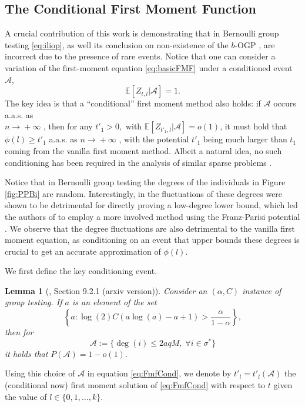 \documentclass[12pt,reqno]{amsart}
\numberwithin{equation}{section}
\newtheorem{lemma}[theorem]{Lemma}
\theoremstyle{definition}
\newcommand{\E}{\mathbb{E}}
\newcommand{\conv}[1]{\overset{#1}{\rightarrow}}
\renewcommand{\[}{\begin{equation}}
\renewcommand{\]}{\end{equation}}
\newcommand{\scr}{\mathcal}
\renewcommand{\|}{\bigg{|}}
\newcommand{\ngrow}{\ensuremath{n \conv{} +\infty} }
\newcommand{\range}[1]{\ensuremath{\{0,1,\dots, #1\}}}
\newcommand{\bogp}{$b$-OGP }
\begin{document}
\subsection{The Conditional First Moment Function}\label{subsec:CFMF}
A crucial contribution of this work is demonstrating that in Bernoulli group testing \eqref{eq:iliop}, as well its conclusion on non-existence of the \bogp\!, are incorrect due to the presence of rare events. Notice that one can consider a variation of the first-moment equation \eqref{eq:basicFMF} under a conditioned event $\scr{A}$, 
\[\E[Z_{t,l}|\scr{A}] = 1. \label{eq:FmfCond}\] 
The key idea is that a ``conditional'' first moment method also holds: if $\scr{A}$ occurs a.a.s. as \\\ngrow, then for any $t'_1>0,$ with $\E[Z_{t'_1,l}|\scr{A}]=o(1)$, it must hold that $\phi(l) \geq t'_1$ a.a.s. as \ngrow\!, with the potential $t'_1$ being much larger than $t_1$ coming from the vanilla first moment method. Albeit a natural idea, no such conditioning has been required in the analysis of similar sparse problems \cite{gamarnik2022sparse, gamarnik2024overlap, arous2023free, chen2024low}. 

Notice that in Bernoulli group testing the degrees of the individuals in Figure \ref{fig:PPBi} are random. Interestingly, in \cite{cojaoghlan2022statistical} the fluctuations of these degrees were shown to be detrimental for directly proving a low-degree lower bound, which led the authors of \cite{cojaoghlan2022statistical} to employ a more involved method using the Franz-Parisi potential \cite{NEURIPS2022_daff6824}. We observe that the degree fluctuations are also detrimental to the vanilla first moment equation, as conditioning on an event that upper bounds these degrees is crucial to get an accurate approximation of $\phi(l)$.  



We first define the key conditioning event. 
\begin{lemma}[\cite{cojaoghlan2022statistical}, Section 9.2.1 (arxiv version)]\label{lem:aSet}
Consider an $(\alpha, C)$ instance of group testing. If $a$ is an element of the set
\[\left\{a : \log(2)C(a \log(a) - a + 1) > \frac{\alpha}{1-\alpha}\right\},\label{eq:a:set}\]
then for $$\scr{A} := \{\deg(i) \leq 2aqM, \;\forall i \in \sigma^*\}$$ it holds that $P(\scr{A}) = 1 - o(1).$
\end{lemma}

Using this choice of $\scr{A}$ in equation \eqref{eq:FmfCond}, we denote by $t'_l=t'_l(\scr{A})$ the (conditional now) first moment solution of \eqref{eq:FmfCond} with respect to $t$ given the value of $l\in \range{k}$.
\end{document}
